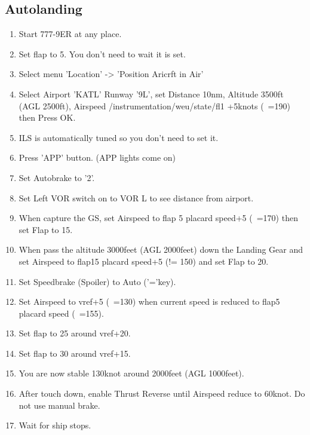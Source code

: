\subsection{Autolanding}
\begin{enumerate}
\item Start 777-9ER at any place.
\item Set flap to 5. You don't need to wait it is set.
\item Select menu 'Location' -> 'Position Aricrft in Air'
\item Select Airport 'KATL' Runway '9L', set Distance 10nm, Altitude 3500ft (AGL 2500ft), Airspeed /instrumentation/weu/state/fl1 +5knots (~=190) then Press OK.
\item ILS is automatically tuned so you don't need to set it.
\item Press 'APP' button. (APP lights come on)
\item Set Autobrake to '2'.
\item Set Left VOR switch on to VOR L to see distance from airport.
\item When capture the GS, set Airspeed to flap 5 placard speed+5 (~=170) then set Flap to 15.
\item When pass the altitude 3000feet (AGL 2000feet) down the Landing Gear and set Airspeed to flap15 placard speed+5 (!= 150) and set Flap to 20.
\item Set Speedbrake (Spoiler) to Auto ('='key).
\item Set Airspeed to vref+5 (~=130) when current speed is reduced to flap5 placard speed (~=155).
\item Set flap to 25 around vref+20.
\item Set flap to 30 around vref+15.
\item You are now stable 130knot around 2000feet (AGL 1000feet).
\item After touch down, enable Thrust Reverse until Airspeed reduce to 60knot. Do not use manual brake.
\item Wait for ship stops.
\end{enumerate}
